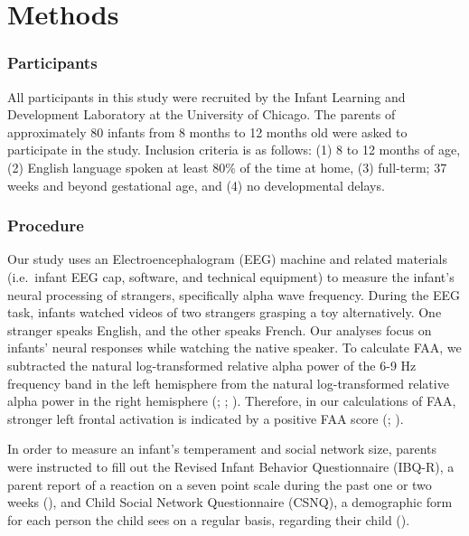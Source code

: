 \documentclass[
  man,
  floatsintext,
  longtable,
  nolmodern,
  notxfonts,
  notimes,
  colorlinks=true,linkcolor=blue,citecolor=blue,urlcolor=blue]{apa7}
\begin{document}
\section{Methods}\label{sec-methods}

\subsubsection{Participants}\label{sec-participants}

All participants in this study were recruited by the Infant Learning and
Development Laboratory at the University of Chicago. The parents of
approximately 80 infants from 8 months to 12 months old were asked to
participate in the study. Inclusion criteria is as follows: (1) 8 to 12
months of age, (2) English language spoken at least 80\% of the time at
home, (3) full-term; 37 weeks and beyond gestational age, and (4) no
developmental delays.

\subsubsection{Procedure}\label{sec-procedure}

Our study uses an Electroencephalogram (EEG) machine and related
materials (i.e.~infant EEG cap, software, and technical equipment) to
measure the infant's neural processing of strangers, specifically alpha
wave frequency. During the EEG task, infants watched videos of two
strangers grasping a toy alternatively. One stranger speaks English, and
the other speaks French. Our analyses focus on infants' neural responses
while watching the native speaker. To calculate FAA, we subtracted the
natural log-transformed relative alpha power of the 6-9 Hz frequency
band in the left hemisphere from the natural log-transformed relative
alpha power in the right hemisphere
(;
; ).
Therefore, in our calculations of FAA, stronger left frontal activation
is indicated by a positive FAA score
(; ).

In order to measure an infant's temperament and social network size,
parents were instructed to fill out the Revised Infant Behavior
Questionnaire (IBQ-R), a parent report of a reaction on a seven point
scale during the past one or two weeks
(), and Child Social Network Questionnaire (CSNQ), a
demographic form for each person the child sees on a regular basis,
regarding their child
().
\end{document}
